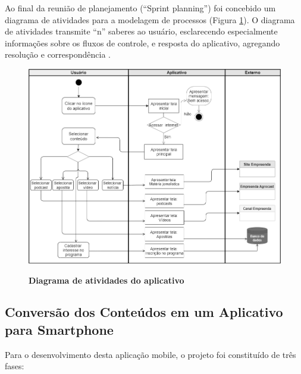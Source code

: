 Ao final da reunião de planejamento (“Sprint planning”) foi concebido um diagrama de atividades para a modelagem de processos (Figura \ref{figura_diagrama}). O diagrama de atividades transmite “n” saberes ao usuário, esclarecendo especialmente informações sobre os fluxos de controle, e resposta do aplicativo, agregando resolução e correspondência \cite{pressman_engenharia_2016}.

\begin{figure}[H]
\centering
\caption{\textbf{Diagrama de atividades do aplicativo}}
\includegraphics[scale=0.5]{Imagens/diagrama_aplicativo.png}
\label{figura_diagrama}
\end{figure}


\subsection{Conversão dos Conteúdos em um Aplicativo para Smartphone}

Para o desenvolvimento desta aplicação mobile, o projeto foi constituído de três fases: 

